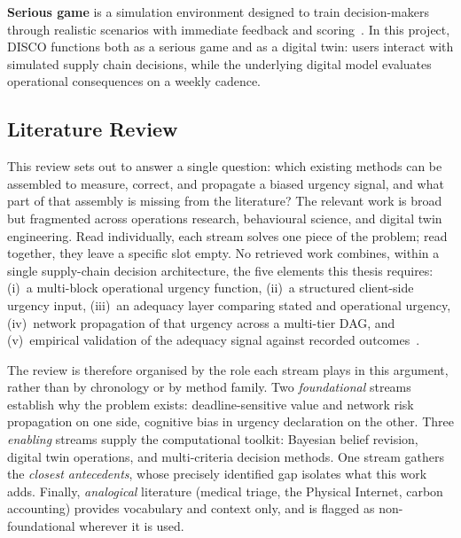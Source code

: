 \textbf{Serious game} is a simulation environment designed to train decision-makers through realistic scenarios with immediate feedback and scoring~\autocite{sterman1989modeling,prensky2001digital}. In this project, DISCO functions both as a serious game and as a digital twin: users interact with simulated supply chain decisions, while the underlying digital model evaluates operational consequences on a weekly cadence.


\subsection{Literature Review}

This review sets out to answer a single question: which existing methods can be
assembled to measure, correct, and propagate a biased urgency signal, and what part
of that assembly is missing from the literature? The relevant work is broad
but fragmented across operations research, behavioural science, and digital twin
engineering. Read individually, each stream solves one piece of the problem; read
together, they leave a specific slot empty. No retrieved work combines, within a single
supply-chain decision architecture, the five elements this thesis requires:
(i)~a multi-block operational urgency function, (ii)~a structured client-side urgency
input, (iii)~an adequacy layer comparing stated and operational urgency, (iv)~network
propagation of that urgency across a multi-tier DAG, and (v)~empirical validation of
the adequacy signal against recorded
outcomes~\autocite{sawik2013integrated,sawik2014joint,sawik2016integrated,cohen2021assigning,hosseini2020bayesian}.

The review is therefore organised by the role each stream plays in this argument,
rather than by chronology or by method family. Two \emph{foundational} streams
establish why the problem exists: deadline-sensitive value and network risk
propagation on one side, cognitive bias in urgency declaration on the other.
Three \emph{enabling} streams supply the computational toolkit: Bayesian belief
revision, digital twin operations, and multi-criteria decision methods. One stream
gathers the \emph{closest antecedents}, whose precisely identified gap isolates what
this work adds. Finally, \emph{analogical} literature (medical triage, the Physical
Internet, carbon accounting) provides vocabulary and context only, and is flagged as
non-foundational wherever it is used.

